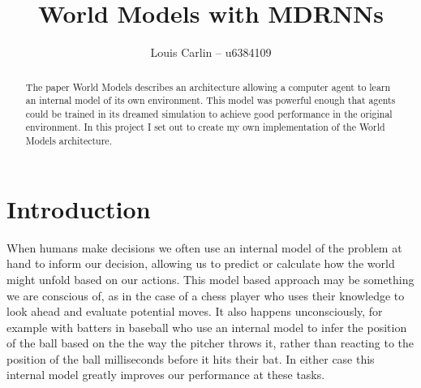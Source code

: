 \documentclass{article}
\author{Louis Carlin -- u6384109}
\title{World Models with MDRNNs}
\numberwithin{figure}{section}
\theoremstyle{definition}
\begin{document}
\maketitle
\begin{abstract}
The paper World Models \citep{ha2018world} describes an architecture allowing a computer agent to learn an internal model of its own environment.
This model was powerful enough that agents could be trained in its dreamed simulation to achieve good performance in the original environment.
In this project I set out to create my own implementation of the World Models architecture.

\end{abstract}

\section{Introduction}
When humans make decisions we often use an internal model of the problem at hand to inform our decision, allowing us to predict or calculate how the world might unfold based on our actions.
This model based approach may be something we are conscious of, as in the case of a chess player who uses their knowledge to look ahead and evaluate potential moves.
It also happens unconsciously, for example with batters in baseball who use an internal model to infer the position of the ball based on the the way the pitcher throws it, rather than reacting to the position of the ball milliseconds before it hits their bat.
In either case this internal model greatly improves our performance at these tasks.


\end{document}

